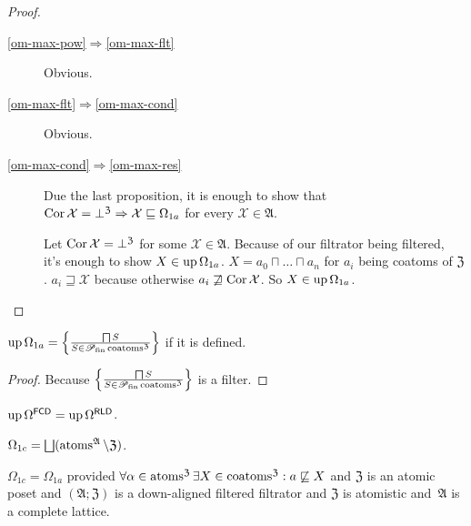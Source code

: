 \begin{proof}
~
\begin{description}
\item[\ref{om-max-pow}$\Rightarrow$\ref{om-max-flt}]
  Obvious.

\item[\ref{om-max-flt}$\Rightarrow$\ref{om-max-cond}]
  Obvious.

\item[\ref{om-max-cond}$\Rightarrow$\ref{om-max-res}]
  Due the last proposition, it is enough to show that $\operatorname{Cor} \mathcal{X}
  = \bot^{\mathfrak{Z}} \Rightarrow \mathcal{X} \sqsubseteq \Omega_{1 a}$ for
  every $\mathcal{X} \in \mathfrak{A}$.
  
  Let $\operatorname{Cor} \mathcal{X} = \bot^{\mathfrak{Z}}$ for some $\mathcal{X} \in
  \mathfrak{A}$. Because of our filtrator being filtered, it's enough to show
  $X \in \operatorname{up} \Omega_{1 a}$. $X = a_0 \sqcap \ldots \sqcap a_n$ for $a_i$
  being coatoms of $\mathfrak{Z}$. $a_i \sqsupseteq \mathcal{X}$ because
  otherwise $a_i \not\sqsupseteq \operatorname{Cor} \mathcal{X}$. So $X
  \in \operatorname{up} \Omega_{1 a}$.
\end{description}
\end{proof}

\begin{prop}
  $\operatorname{up} \Omega_{1a} = \left\{ \frac{ \bigsqcap S }{ S \in
  \mathscr{P}_{\operatorname{fin}} \operatorname{coatoms}^{\mathfrak{Z}} }\right\}$
  if it is defined.
\end{prop}

\begin{proof}
  Because $\left\{ \frac{ \bigsqcap S }{ S \in
  \mathscr{P}_{\operatorname{fin}} \operatorname{coatoms}^{\mathfrak{Z}} }\right\}$ is a
  filter.
\end{proof}

\begin{cor}
  $\operatorname{up} \Omega^{\mathsf{FCD}} = \operatorname{up}
  \Omega^{\mathsf{RLD}}$.
\end{cor}

\begin{defn}
$\Omega_{1c} =
\bigsqcup(\atoms^{\mathfrak{A}}\setminus\mathfrak{Z})$.
\end{defn}

\begin{prop}
$\Omega_{1c} = \Omega_{1a}$ provided
  $\forall \alpha \in \operatorname{atoms}^{\mathfrak{Z}} \exists X \in \operatorname{coatoms}^{\mathfrak{Z}} : a \not\sqsubseteq X$ and $\mathfrak{Z}$ is an atomic
  poset and $(\mathfrak{A}; \mathfrak{Z})$ is a down-aligned
  filtered filtrator and $\mathfrak{Z}$ is atomistic and~$\mathfrak{A}$
  is a complete lattice.
\end{prop}

